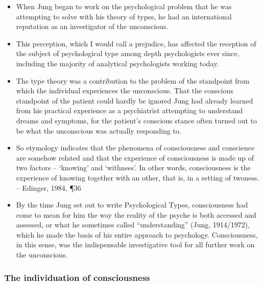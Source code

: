 \begin{itemize}

\item When Jung began to work on the psychological problem that he was
attempting to solve with his theory of types, he had an international
reputation as an investigator of the unconscious.

\item This perception, which I would call a prejudice, has affected the
reception of the subject of psychological type among depth psychologists ever
since, including the majority of analytical psychologists working today.

\item The type theory was a contribution to the problem of the standpoint from
which the individual experiences the unconscious. That the conscious standpoint
of the patient could hardly be ignored Jung had already learned from his
practical experience as a psychiatrist attempting to understand dreams and
symptoms, for the patient's conscious stance often turned out to be what the
unconscious was actually responding to.

\item So etymology indicates that the phenomena of consciousness and conscience
are somehow related and that the experience of consciousness is made up of two
factors -- `knowing' and `withness'. In other words, consciousness is the
experience of knowing together with an other, that is, in a setting of twoness.
-- Edinger, 1984, \P 36

\item By the time Jung set out to write Psychological Types, consciousness had
come to mean for him the way the reality of the psyche is both accessed and
assessed, or what he sometimes called ``understanding'' (Jung, 1914/1972),
which he made the basis of his entire approach to psychology. Consciousness, in
this sense, was the indispensable investigative tool for all further work on
the unconscious.

\end{itemize}

\subsubsection{The individuation of consciousness}


